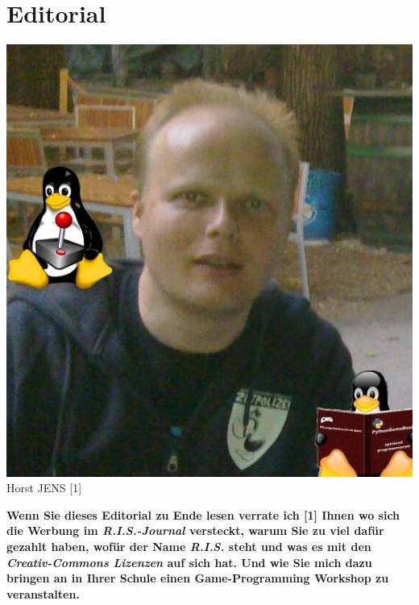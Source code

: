 \section*{Editorial} 
\hypertarget{editorial}{}
\label{editorial}

\begin{center}
\includegraphics[width=0.8\linewidth]{editorial/horst2011mitdoppeltux.jpg}\\ 
\footnotesize{Horst JENS [1]}
\end{center}   
\textbf{Wenn Sie dieses Editorial zu Ende lesen verrate ich [1] Ihnen wo sich die Werbung im \textit{R.I.S.-Journal} versteckt, warum Sie zu viel daf\"ur gezahlt haben, wof\"ur der Name \textit{R.I.S.} steht und was es mit den \textit{Creativ-Commons Lizenzen} auf sich hat. Und wie Sie mich dazu bringen an in Ihrer Schule einen Game-Programming Workshop zu veranstalten.} 


